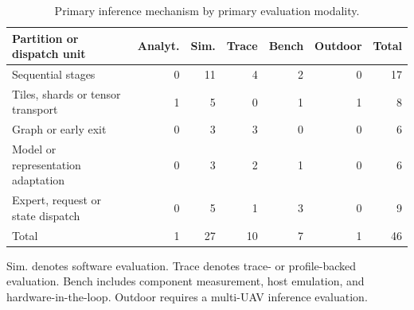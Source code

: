 \begin{table}[tbp]
\caption{Primary inference mechanism by primary evaluation modality.}\label{tab:settings}
\centering\small\setlength{\tabcolsep}{4pt}
\begin{tabular}{@{}p{.31\linewidth}rrrrrr@{}}
\toprule
Partition or dispatch unit & Analyt. & Sim. & Trace & Bench & Outdoor & Total \\
\midrule
Sequential stages & 0 & 11 & 4 & 2 & 0 & 17 \\
Tiles, shards or tensor transport & 1 & 5 & 0 & 1 & 1 & 8 \\
Graph or early exit & 0 & 3 & 3 & 0 & 0 & 6 \\
Model or representation adaptation & 0 & 3 & 2 & 1 & 0 & 6 \\
Expert, request or state dispatch & 0 & 5 & 1 & 3 & 0 & 9 \\
Total & 1 & 27 & 10 & 7 & 1 & 46 \\
\bottomrule
\end{tabular}
\par\smallskip\raggedright Sim. denotes software evaluation. Trace denotes trace- or profile-backed evaluation. Bench includes component measurement, host emulation, and hardware-in-the-loop. Outdoor requires a multi-UAV inference evaluation.
\end{table}
